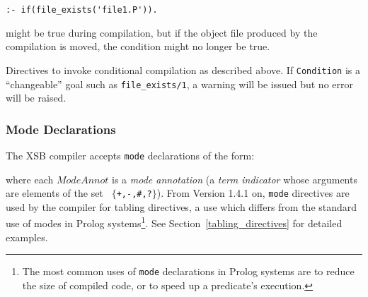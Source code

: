 \begin{verbatim}
:- if(file_exists('file1.P')).
\end{verbatim}

might be true during compilation, but if the object file produced by
the compilation is moved, the condition might no longer be true.

\begin{description}
%
Directives to invoke conditional compilation as described above.  If
{\tt Condition} is a ``changeable'' goal such as {\tt file\_exists/1},
a warning will be issued but no error will be raised.
\end{description}


%
\subsubsection{Mode Declarations}\label{mode_declarations}

The XSB compiler accepts {\tt mode} declarations of the form:


\noindent
where each $ModeAnnot$ is a {\em mode annotation\/} (a {\em term
indicator\/} whose arguments are elements of the set {\tt
$\{$+,-,\#,?$\}$}).  From Version 1.4.1 on, {\tt mode} directives are
used by the compiler for tabling directives, a use which differs from
the standard use of modes in Prolog systems\footnote{The most common
uses of {\tt mode} declarations in Prolog systems are to reduce the
size of compiled code, or to speed up a predicate's execution.}.  See
Section~\ref{tabling_directives} for detailed examples.


